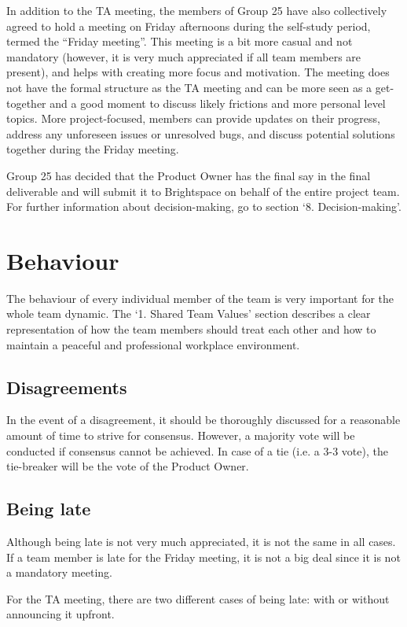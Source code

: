 \documentclass[sigconf,nonacm]{acmart}
\begin{document}
In addition to the TA meeting, the members of Group 25 have also collectively agreed to hold a meeting on Friday afternoons during the self-study period, termed the “Friday meeting”. This meeting is a bit more casual and not mandatory (however, it is very much appreciated if all team members are present), and helps with creating more focus and motivation. The meeting does not have the formal structure as the TA meeting and can be more seen as a get-together and a good moment to discuss likely frictions and more personal level topics. More project-focused, members can provide updates on their progress, address any unforeseen issues or unresolved bugs, and discuss potential solutions together during the Friday meeting.

Group 25 has decided that the Product Owner has the final say in the final deliverable and will submit it to Brightspace on behalf of the entire project team. For further information about decision-making, go to section ‘8. Decision-making’.



\section{Behaviour}
The behaviour of every individual member of the team is very important for the whole team dynamic. The ‘1. Shared Team Values’ section describes a clear representation of how the team members should treat each other and how to maintain a peaceful and professional workplace environment.

\subsection{Disagreements}
In the event of a disagreement, it should be thoroughly discussed for a reasonable amount of time to strive for consensus. However, a majority vote will be conducted if consensus cannot be achieved. In case of a tie (i.e. a 3-3 vote), the tie-breaker will be the vote of the Product Owner.

\subsection{Being late}
Although being late is not very much appreciated, it is not the same in all cases. If a team member is late for the Friday meeting, it is not a big deal since it is not a mandatory meeting.

For the TA meeting, there are two different cases of being late: with or without announcing it upfront.
\end{document}
